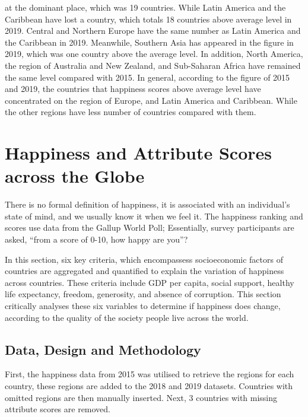 \documentclass[11pt,a4paper,]{article}
\begin{document}
at the dominant place, which was 19 countries. While Latin America and the Caribbean have lost a country, which totals 18 countries above average level in 2019. Central and Northern Europe have the same number as Latin America and the Caribbean in 2019. Meanwhile, Southern Asia has appeared in the figure in 2019, which was one country above the average level. In addition, North America, the region of Australia and New Zealand, and Sub-Saharan Africa have remained the same level compared with 2015.
In general, according to the figure of 2015 and 2019, the countries that happiness scores above average level have concentrated on the region of Europe, and Latin America and Caribbean. While the other regions have less number of countries compared with them.

\clearpage

\hypertarget{happiness-and-attribute-scores-across-the-globe}{%
\section{Happiness and Attribute Scores across the Globe}\label{happiness-and-attribute-scores-across-the-globe}}

There is no formal definition of happiness, it is associated with an individual's state of mind, and we usually know it when we feel it. The happiness ranking and scores use data from the Gallup World Poll; Essentially, survey participants are asked, ``from a score of 0-10, how happy are you''? \autocite{sachs2018world}

In this section, six key criteria, which encompassess socioeconomic factors of countries are aggregated and quantified to explain the variation of happiness across countries. These criteria include GDP per capita, social support, healthy life expectancy, freedom, generosity, and absence of corruption. This section critically analyses these six variables to determine if happiness does change, according to the quality of the society people live across the world.

\clearpage

\hypertarget{data-design-and-methodology}{%
\subsection{Data, Design and Methodology}\label{data-design-and-methodology}}

First, the happiness data from 2015 was utilised to retrieve the regions for each country, these regions are added to the 2018 and 2019 datasets. Countries with omitted regions are then manually inserted. Next, 3 countries with missing attribute scores are removed.
\end{document}
